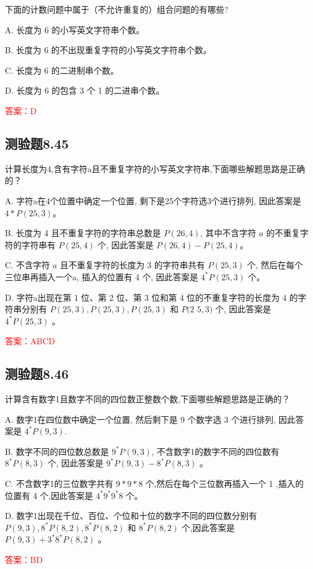 \documentclass[UTF8, heading=true]{ctexart}
\begin{document}
下面的计数问题中属于（不允许重复的）组合问题的有哪些?

A. 长度为 6 的小写英文字符串个数。

B. 长度为 6 的不出现重复字符的小写英文字符串个数。

C. 长度为 6 的二进制串个数。

D. 长度为 6 的包含 3 个 1 的二进串个数。

\textcolor{red}{答案：D}

\subsection{测验题8.45}

计算长度为4,含有字符a且不重复字符的小写英文字符串,下面哪些解题思路是正确的？

A. 字符a在4个位置中确定一个位置, 剩下是25个字符选3个进行排列, 因此答案是$4*P(25, 3)$。

B. 长度为 4 且不重复字符的字符串总数是 $P(26,4)$, 其中不含字符 $a$ 的不重复字符的字符串有 $P(25,4)$ 个, 因此答案是 $P(26, 4)-P(25,4)$。

C. 不含字符 $a$ 且不重复字符的长度为 3 的字符串共有 $P(25,3)$ 个, 然后在每个三位串再插入一个a, 插入的位置有 4 个, 因此答案是 $4^* P(25,3)$ 个。

D. 字符a出现在第 1 位、第 2 位、第 3 位和第 4 位的不重复字符的长度为 4 的字符串分别有 $P(25,3), P(25,3), P(25,3)$ 和 $P(2$ $5,3)$ 个, 因此答案是 $4^* P(25,3)$ 。


\textcolor{red}{答案：ABCD}

\subsection{测验题8.46}

计算含有数字1且数字不同的四位数正整数个数,下面哪些解题思路是正确的？

A. 数字1在四位数中确定一个位置, 然后剩下是 9 个数字选 3 个进行排列, 因此答案是 $4 ^* P(9,3)$.

B. 数字不同的四位数总数是 $9^* P(9,3)$, 不含数字1的数字不同的四位数有 $8^* P(8,3)$ 个, 因此答案是 $9 ^* P(9,3)-8^* P(8,3)$ 。

C. 不含数字1的三位数字共有 $9 * 9 * 8$ 个,然后在每个三位数再插入一个 1 ,插入的位置有 4 个,因此答案是 $4 ^* 9 ^* 9 ^* 8$ 个。

D. 数字1出现在千位、百位、个位和十位的数字不同的四位数分别有 $P(9,3), 8 ^* P(8,2), 8^* P(8,2)$ 和 $8 ^* P(8,2)$ 个,因此答案是 $P(9,3) + 3^* 8^* P(8,2)$ 。

\textcolor{red}{答案：BD}
\end{document}
